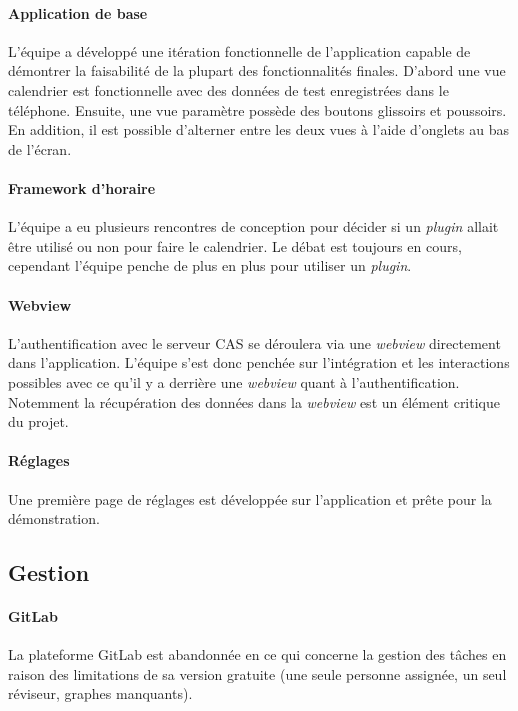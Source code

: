 	\paragraph{Application de base} L'équipe a développé une itération fonctionnelle de l'application capable de démontrer la faisabilité de la plupart des fonctionnalités finales. D'abord une vue calendrier est fonctionnelle avec des données de test enregistrées dans le téléphone. Ensuite, une vue paramètre possède des boutons glissoirs et poussoirs. En addition, il est possible d'alterner entre les deux vues à l'aide d'onglets au bas de l'écran.
	
	\paragraph{Framework d'horaire} L'équipe a eu plusieurs rencontres de conception pour décider si un \emph{plugin} allait être utilisé ou non pour faire le calendrier. Le débat est toujours en cours, cependant l'équipe penche de plus en plus pour utiliser un \emph{plugin}.


	\paragraph{Webview} L'authentification avec le serveur CAS se déroulera via une \emph{webview} directement dans l'application. L'équipe s'est donc penchée sur l'intégration et les interactions possibles avec ce qu'il y a derrière une \emph{webview} quant à l'authentification. Notemment la récupération des données dans la \emph{webview} est un élément critique du projet.
	
	\paragraph{Réglages} Une première page de réglages est développée sur l'application et prête pour la démonstration.
	
	\subsection{Gestion}

	\paragraph{GitLab} La plateforme GitLab est abandonnée en ce qui concerne la gestion des tâches en raison des limitations de sa version gratuite (une seule personne assignée, un seul réviseur, graphes manquants).
	
